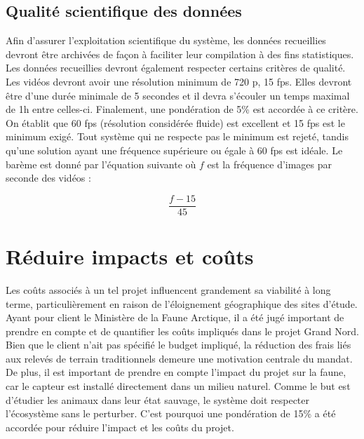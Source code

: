 \subsection{Qualité scientifique des données}
\label{exploitation_scientifique}
Afin d’assurer l’exploitation scientifique du système, les données recueillies devront être archivées de façon à faciliter leur compilation à des fins statistiques.
Les données recueillies devront également respecter certains critères de qualité.
Les vidéos devront avoir une résolution minimum de 720 p, 15 fps. Elles devront être d’une durée minimale de 5 secondes et il devra s’écouler un temps maximal de 1h entre celles-ci.
Finalement, une pondération de 5\% est accordée à ce critère.
On établit que 60 fps (résolution considérée fluide) est excellent et 15 fps est le minimum exigé.
Tout système qui ne respecte pas le minimum est rejeté, tandis qu'une solution ayant une fréquence supérieure ou égale à 60 fps est idéale.
Le barème est donné par l’équation suivante où $f$ est la fréquence d’images par seconde des vidéos :

\begin{equation}
    \frac{f-15}{45}
\end{equation}

\section{Réduire impacts et coûts}
\label{impacts_couts}
Les coûts associés à un tel projet influencent grandement sa viabilité à long terme, particulièrement en raison de l'éloignement géographique des sites d'étude. Ayant pour client le Ministère de la Faune Arctique, il a été jugé important de prendre en compte et de quantifier les coûts impliqués dans le projet Grand Nord. Bien que le client n’ait pas spécifié le budget impliqué, la réduction des frais liés aux relevés de terrain traditionnels demeure une motivation centrale du mandat. De plus, il est important de prendre en compte l’impact du projet sur la faune, car le capteur est installé directement dans un milieu naturel. Comme le but est d'étudier les animaux dans leur état sauvage, le système doit respecter l'écosystème sans le perturber. C’est pourquoi une pondération de 15\% a été accordée pour réduire l’impact et les coûts du projet.

